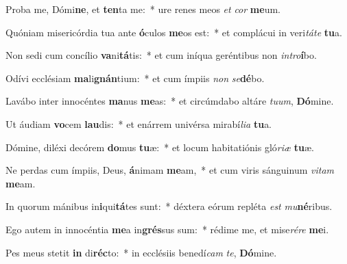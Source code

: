 \item Proba me, Dómi\textbf{ne}, et \textbf{ten}ta me:~* ure renes meos \textit{et} \textit{cor} \textbf{me}um.
\item Quóniam misericórdia tua ante \textbf{ó}culos \textbf{me}os est:~* et complácui in veri\textit{tá}\textit{te} \textbf{tu}a.
\item Non sedi cum concílio \textbf{va}ni\textbf{tá}tis:~* et cum iníqua geréntibus non \textit{in}\textit{tro}\textbf{í}bo.
\item Odívi ecclésiam \textbf{ma}li\textbf{gnán}tium:~* et cum ímpiis \textit{non} \textit{se}\textbf{dé}bo.
\item Lavábo inter innocéntes \textbf{ma}nus \textbf{me}as:~* et circúmdabo altáre \textit{tu}\textit{um}, \textbf{Dó}mine.
\item Ut áudiam \textbf{vo}cem \textbf{lau}dis:~* et enárrem univérsa mirabí\textit{li}\textit{a} \textbf{tu}a.
\item Dómine, diléxi decórem \textbf{do}mus \textbf{tu}æ:~* et locum habitatiónis gló\textit{ri}\textit{æ} \textbf{tu}æ.
\item Ne perdas cum ímpiis, Deus, \textbf{á}nimam \textbf{me}am,~* et cum viris sánguinum \textit{vi}\textit{tam} \textbf{me}am.
\item In quorum mánibus in\textbf{i}qui\textbf{tá}tes sunt:~* déxtera eórum repléta \textit{est} \textit{mu}\textbf{né}ribus.
\item Ego autem in innocéntia \textbf{me}a in\textbf{grés}sus sum:~* rédime me, et mise\textit{ré}\textit{re} \textbf{me}i.
\item Pes meus stetit \textbf{in} di\textbf{réc}to:~* in ecclésiis benedí\textit{cam} \textit{te}, \textbf{Dó}mine.
